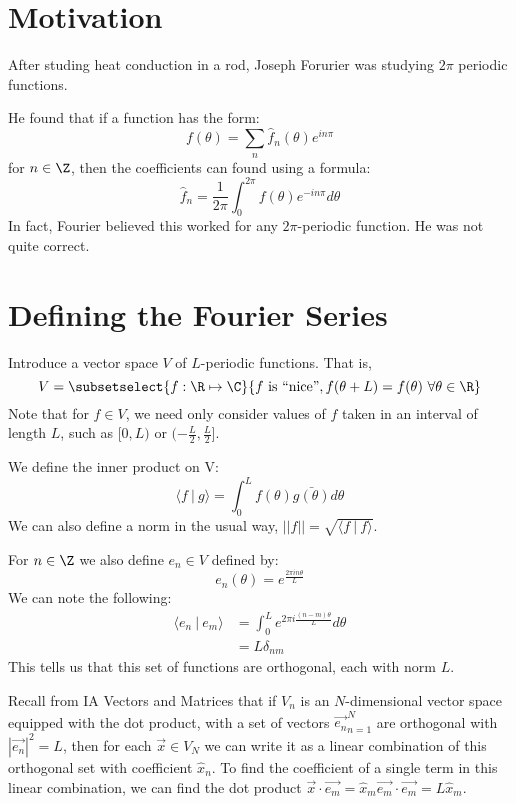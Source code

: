\documentclass[../Main.tex]{subfiles}
\begin{document}
\section{Motivation}
After studing heat conduction in a rod, Joseph Forurier was studying $2\pi$ periodic functions.

He found that if a function has the form:
\begin{equation*}
    f(\theta) = \sum_n \hat{f}_n(\theta) e^{in\pi}
\end{equation*}
for $n \in \Z$, then the coefficients can found using a formula:
\begin{equation*}
    \hat{f}_n = \frac{1}{2\pi} \int_0^{2\pi} f(\theta) e^{-in\pi} d\theta
\end{equation*}
In fact, Fourier believed this worked for any $2\pi$-periodic function. He was not quite correct.
\section{Defining the Fourier Series}
Introduce a vector space $V$ of $L$-periodic functions. That is,
\begin{equation*}
    V = \subsetselect{f : \R \mapsto \C}{f\text{ is ``nice''}, f(\theta + L) = f(\theta)~\forall \theta \in \R}
\end{equation*}
Note that for $f \in V$, we need only consider values of $f$ taken in an interval of length $L$, such as $[0, L)$ or $(-\frac{L}{2}, \frac{L}{2}]$.

We define the inner product on V:
\begin{equation}
    \langle f~|~g\rangle = \int_0^L f(\theta) \bar{g(\theta)} d\theta
    \label{eqnInnerProdFuncs}
\end{equation}
We can also define a norm in the usual way, $||f|| = \sqrt{\langle f~|~f\rangle}$.

For $n \in \Z$ we also define $e_n \in V$ defined by:
\begin{equation}
    e_n(\theta) = e^\frac{2\pi in\theta}{L}
    \label{eqnFuncSpaceBasis}
\end{equation}
We can note the following:
\begin{align*}
    \langle e_n~|~e_m\rangle &= \int_0^L e^{2\pi i \frac{(n-m)\theta}{L}} d\theta \\
    &= L\delta_{nm}
\end{align*}
This tells us that this set of functions are orthogonal, each with norm $L$.

Recall from IA Vectors and Matrices that if $V_n$ is an $N$-dimensional vector space equipped with the dot product, with a set of vectors ${\vec{e_n}}_{n = 1}^N$ are orthogonal with $|\vec{e_n}|^2 = L$, then for each $\vec{x} \in V_N$ we can write it as a linear combination of this orthogonal set with coefficient $\hat{x}_n$. To find the coefficient of a single term in this linear combination, we can find the dot product $\vec{x} \cdot \vec{e_m} = \hat{x}_m \vec{e_m} \cdot \vec{e_m} = L\hat{x}_m$.
\end{document}
